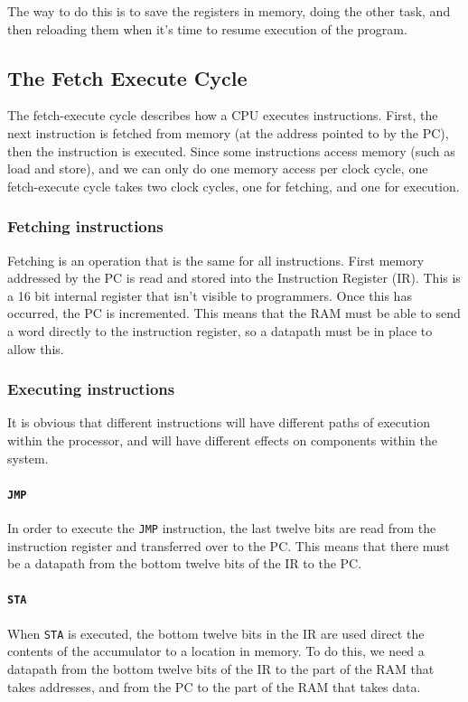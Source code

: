 The way to do this is to save the registers in memory, doing the other task, and
then reloading them when it's time to resume execution of the program.

\subsection{The Fetch Execute Cycle}

The fetch-execute cycle describes how a CPU executes instructions. First, the
next instruction is fetched from memory (at the address pointed to by the PC),
then the instruction is executed. Since some instructions access memory (such as
load and store), and we can only do one memory access per clock cycle, one
fetch-execute cycle takes two clock cycles, one for fetching, and one for
execution.

\subsubsection{Fetching instructions}

Fetching is an operation that is the same for all instructions. First memory
addressed by the PC is read and stored into the Instruction Register (IR). This
is a 16 bit internal register that isn't visible to programmers. Once this has
occurred, the PC is incremented. This means that the RAM must be able to send a
word directly to the instruction register, so a datapath must be in place to
allow this.

\subsubsection{Executing instructions}

It is obvious that different instructions will have different paths of execution
within the processor, and will have different effects on components within the
system.

\paragraph{{\tt JMP}} In order to execute the {\tt JMP} instruction, the last
twelve bits are read from the instruction register and transferred over to the
PC. This means that there must be a datapath from the bottom twelve bits of the
IR to the PC.

\paragraph{{\tt STA}} When {\tt STA} is executed, the bottom twelve bits in the IR
are used direct the contents of the accumulator to a location in memory. To do
this, we need a datapath from the bottom twelve bits of the IR to the part of
the RAM that takes addresses, and from the PC to the part of the RAM that takes
data.

